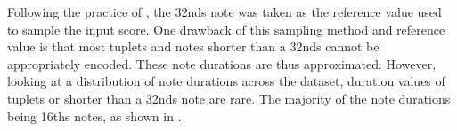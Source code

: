 
Following the practice of \textcite{micchi2020not}, the
\glspl{32nd} note was taken as the reference value used to
sample the input score. One drawback of this sampling method
and reference value is that most tuplets and notes shorter
than a \glspl{32nd} cannot be appropriately encoded. These
note durations are thus approximated. However, looking at a
distribution of note durations across the dataset, duration
values of tuplets or shorter than a \glspl{32nd} note are
rare. The majority of the note durations being \glspl{16th}
notes, as shown in . 

